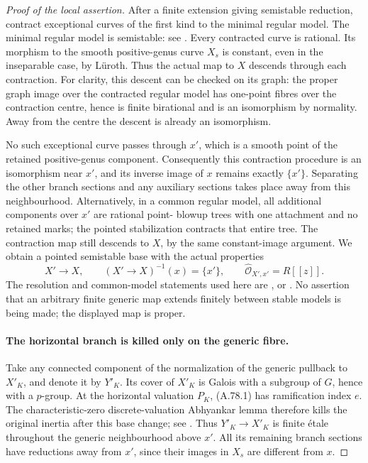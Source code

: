 \begin{proof}[Proof of the local assertion]
After a finite extension giving semistable reduction,
contract exceptional curves of the first kind to the
minimal regular model. The minimal regular model is
semistable: see \cite[Lemmas 55.8.5 and 55.14.5, Tags 0CD9 and 0CDG]{fghStacksKummerModels}.
Every contracted curve is rational. Its morphism to the
smooth positive-genus curve \(X_s\) is constant, even
in the inseparable case, by L\"uroth. Thus the actual map
to \(X\) descends through each contraction. For clarity,
this descent can be checked on its graph: the proper graph
image over the contracted regular model has one-point
fibres over the contraction centre, hence is finite
birational and is an isomorphism by normality. Away from
the centre the descent is already an isomorphism.

No such exceptional curve passes through \(x'\), which
is a smooth point of the retained positive-genus component.
Consequently this contraction procedure is an isomorphism
near \(x'\), and its inverse image of \(x\) remains
exactly \(\{x'\}\). Separating the other branch sections
and any auxiliary sections takes place away from this
neighbourhood. Alternatively, in a common regular model,
all additional components over \(x'\) are rational point-
blowup trees with one attachment and no retained marks;
the pointed stabilization contracts that entire tree.
The contraction map still descends to \(X\), by the same
constant-image argument. We obtain a pointed semistable
base with the actual properties
\[
 X'\longrightarrow X,\qquad (X'\longrightarrow X)^{-1}(x)
       =\{x'\},\qquad
 \widehat{\mathcal O}_{X',x'}=R[[z]].                    \tag{A.78.3}
\]
The resolution and common-model statements used here are
\cite[Lemma 54.4.3 and \S54.17, Tags 0C5H and 0C5Q]{fghStacksKummerModels}, or
\cite[\S9.2 and \S10.3]{fghLiu}. No assertion that
an arbitrary finite generic map extends finitely between
stable models is being made; the displayed map is proper.

\paragraph{The horizontal branch is killed only on the generic fibre.}
Take any connected component of the normalization of the
generic pullback to \(X'_K\), and denote it by \(Y'_K\).
Its cover of \(X'_K\) is Galois with a subgroup of \(G\),
hence with a \(p\)-group. At the horizontal valuation
\(P_K\), (A.78.1) has ramification index \(e\).
The characteristic-zero discrete-valuation Abhyankar lemma
therefore kills the original inertia after this base change;
see \cite[Lemma 15.116.4, Tag 0BRM]{fghStacksKummerModels}. Thus \(Y'_K\to X'_K\)
is finite \'etale throughout the generic neighbourhood
above \(x'\). All its remaining branch sections have
reductions away from \(x'\), since their images in \(X_s\)
are different from \(x\).


\end{proof}
